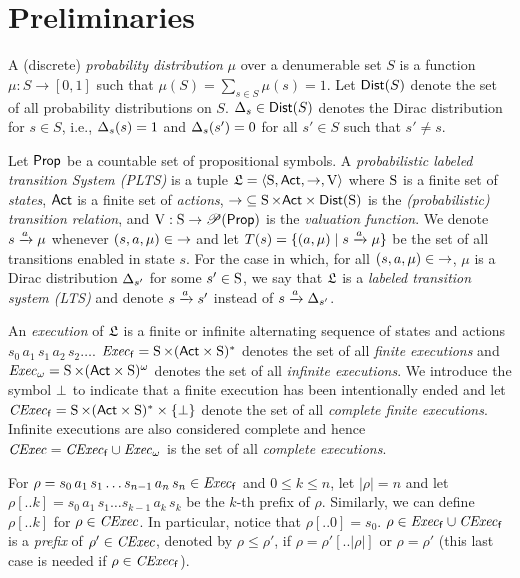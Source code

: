 \section{Preliminaries}
\label{sec:preliminaries}


A (discrete) \emph{probability distribution} $\mu$ over a denumerable
set $S$ is a function $\mu: S \rightarrow [0, 1] $ such that
$\mu(S) = \sum_{s \in S} \mu(s) = 1$.  Let $\dist(S)$ denote the set
of all probability distributions on $S$.  $\Dirac_s \in \dist(S)$
denotes the Dirac distribution for $s \in S$, i.e., $\Dirac_s(s) =1$
and $\Dirac_s(s') = 0$ for all $s' \in S$ such that $s'\neq s$.

Let $\PROP$ be a countable set of propositional symbols.
%
A \emph{probabilistic labeled transition System (PLTS)} is a tuple
$\model=\tup{\S,\ACT,\ra,\V}$ where $\S$ is a finite set of
\emph{states}, $\ACT$ is a finite set of \emph{actions},
${\ra}\subseteq {\S \times \ACT \times \dist(\S)}$ is the
\emph{(probabilistic) transition relation}, and
$\V:\S\to\powerset(\PROP)$ is the \emph{valuation function}.
%
We denote $s\reach{a}\mu$ whenever $(s,a,\mu)\in{\ra}$ and let
$T(s)=\{(a,\mu)\mid {s\reach{a}\mu}\}$ be the set of all transitions
enabled in state $s$.
%
For the case in which, for all $(s,a,\mu)\in{\ra}$, $\mu$ is a Dirac
distribution $\Dirac_{s'}$ for some $s'\in\S$, we say that $\model$ is
a \emph{labeled transition system (LTS)} and denote $s\reach{a}s'$
instead of $s\reach{a}\Dirac_{s'}$.

An \emph{execution} of $\model$ is a finite or infinite alternating
sequence of states and actions $s_0\, a_1\, s_1\, a_2\, s_2\ldots$.
$\execf= \S\times(\ACT\times\S)^*$ denotes the set of all
\emph{finite executions} and $\execw= \S\times(\ACT\times\S)^\omega$
denotes the set of all \emph{infinite executions}.
%
We introduce the symbol $\complete$ to indicate that a finite
execution has been intentionally ended and let $\cexecf=
\S\times(\ACT\times\S)^*\times\{\complete\}$ denote the set of all
\emph{complete finite executions}.  Infinite executions are also
considered complete and hence $\cexec=\cexecf\cup\execw$ is the
set of all \emph{complete executions}.

For $\rho = s_0\, a_1\, s_1\ldots s_{n-1}\, a_n\, s_n \in \execf$ and
$0\leq k\leq n$, let $|\rho|=n$ and let
$\rho[..k] = s_0\, a_1\, s_1\ldots s_{k-1}\, a_k\, s_k$ be the $k$-th
prefix of $\rho$.
%
Similarly, we can define $\rho[..k]$ for $\rho\in\cexec$.
In particular, notice that $\rho[..0]=s_0$.
%
$\rho \in \execf\cup\cexecf$ is a \emph{prefix} of $\rho' \in \cexec$,
denoted by $\rho\leq\rho'$, if $\rho=\rho'[..|\rho|]$ or $\rho=\rho'$
(this last case is needed if $\rho\in\cexecf$).

